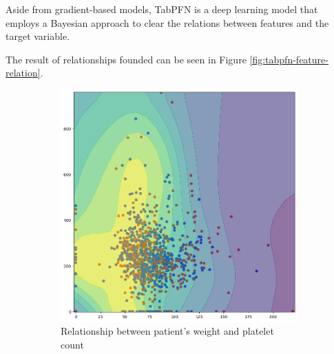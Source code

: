 \documentclass[../main.tex]{subfiles}
\begin{document}
Aside from gradient-based models, TabPFN is a deep learning model that employs a Bayesian approach to clear the relations between features and the target variable.

The result of relationships founded can be seen in Figure \ref{fig:tabpfn-feature-relation}.

\begin{figure}[H]
    \centering
    \caption{Feature relation of TabPFN model}
    \label{fig:tabpfn-feature-relation}
    \begin{subfigure}{0.45\textwidth}
        \centering
        \includegraphics[width=\linewidth]{Figure/weight-plt.png}
        \caption{Relationship between patient's weight and platelet count}
        \label{fig:tabpfn-weight-plt}
    \end{subfigure}
    \hfill
    \begin{subfigure}{0.45\textwidth}
        \centering

\end{subfigure}
\end{figure}
\end{document}
